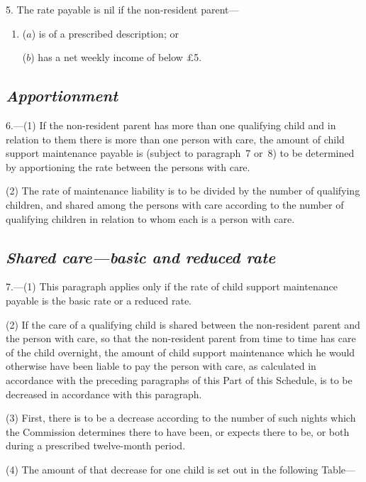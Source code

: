 \documentclass[12pt,a4paper]{article}
\begin{document}
5. The rate payable is nil if the non-resident parent—
\begin{enumerate}\item[]
($a$) is of a prescribed description; or

($b$) has a net weekly income of below £5. 
\end{enumerate}

\subsection*{\itshape Apportionment}

6.---(1) If the non-resident parent has more than one qualifying child and in relation to them there is more than one person with care, the amount of child support maintenance payable is (subject to paragraph~7 or~8) to be determined by apportioning the rate between the persons with care.

(2) The rate of maintenance liability is to be divided by the number of qualifying children, and shared among the persons with care according to the number of qualifying children in relation to whom each is a person with care.

\subsection*{\itshape Shared care—basic and reduced rate}

7.---(1) This paragraph applies only if the rate of child support maintenance payable is the basic rate or a reduced rate.

(2) If the care of a qualifying child is shared between the non-resident parent and the person with care, so that the non-resident parent from time to time has care of the child overnight, the amount of child support maintenance which he would otherwise have been liable to pay the person with care, as calculated in accordance with the preceding paragraphs of this Part of this Schedule, is to be decreased in accordance with this paragraph.

(3) First, there is to be a decrease according to the number of such nights which the 
Commission  %
determines there to have been, or expects there to be, or both during a prescribed twelve-month period.

(4) The amount of that decrease for one child is set out in the following Table—

\medskip
\end{document}

